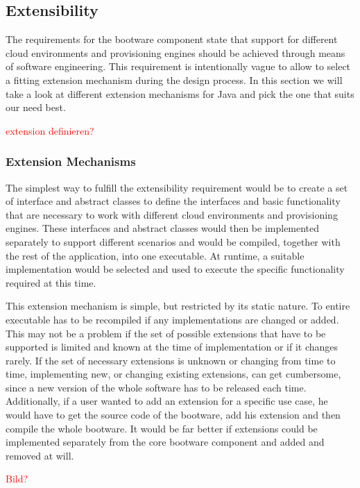 \subsection{Extensibility}
\label{design:extensibility}

The requirements for the bootware component state that support for different cloud environments and provisioning engines should be achieved through means of software engineering.
This requirement is intentionally vague to allow to select a fitting extension mechanism during the design process.
In this section we will take a look at different extension mechanisms for Java and pick the one that suits our need best.

\textcolor{red}{extension definieren?}

\subsubsection{Extension Mechanisms}

The simplest way to fulfill the extensibility requirement would be to create a set of interface and abstract classes to define the interfaces and basic functionality that are necessary to work with different cloud environments and provisioning engines.
These interfaces and abstract classes would then be implemented separately to support different scenarios and would be compiled, together with the rest of the application, into one executable.
At runtime, a suitable implementation would be selected and used to execute the specific functionality required at this time.

This extension mechanism is simple, but restricted by its static nature.
To entire executable has to be recompiled if any implementations are changed or added.
This may not be a problem if the set of possible extensions that have to be supported is limited and known at the time of implementation or if it changes rarely.
If the set of necessary extensions is unknown or changing from time to time, implementing new, or changing existing extensions, can get cumbersome, since a new version of the whole software has to be released each time.
Additionally, if a user wanted to add an extension for a specific use case, he would have to get the source code of the bootware, add his extension and then compile the whole bootware.
It would be far better if extensions could be implemented separately from the core bootware component and added and removed at will.

\textcolor{red}{Bild?}

